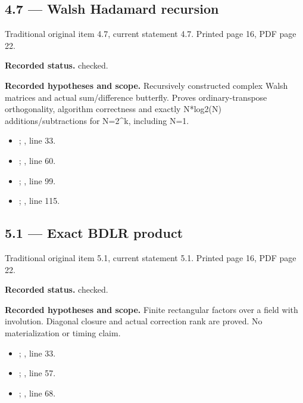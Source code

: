 \subsection{4.7 — Walsh Hadamard recursion}
\label{result:4.7}
{\footnotesize\color{muted}Traditional original item 4.7, current statement 4.7. Printed page 16, PDF page 22.}\par
\textbf{Recorded status.} checked.

\textbf{Recorded hypotheses and scope.} Recursively constructed complex Walsh matrices and actual sum/difference butterfly. Proves ordinary-transpose orthogonality, algorithm correctness and exactly N*log2(N) additions/subtractions for N=2\textasciicircum{}k, including N=1.

\begin{itemize}
\item {}; , line 33.
\item {}; , line 60.
\item {}; , line 99.
\item {}; , line 115.
\end{itemize}
\subsection{5.1 — Exact BDLR product}
\label{result:5.1}
{\footnotesize\color{muted}Traditional original item 5.1, current statement 5.1. Printed page 16, PDF page 22.}\par
\textbf{Recorded status.} checked.

\textbf{Recorded hypotheses and scope.} Finite rectangular factors over a field with involution. Diagonal closure and actual correction rank are proved. No materialization or timing claim.

\begin{itemize}
\item {}; , line 33.
\item {}; , line 57.
\item {}; , line 68.
\end{itemize}
